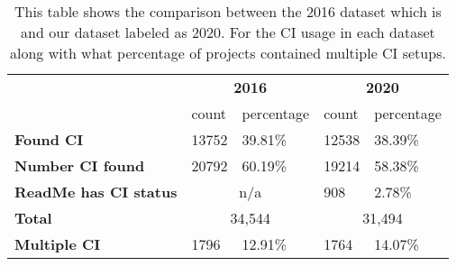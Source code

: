 \begin{table}[!ht]
    \begin{tabular}{l|l|l|l|l|}
    \cline{2-5}
                                                & \multicolumn{2}{c|}{\textbf{2016}} & \multicolumn{2}{c|}{\textbf{2020}} \\ \cline{2-5} 
                                                & count         & percentage         & count         & percentage         \\ \hline
    \multicolumn{1}{|l|}{\textbf{Found CI}}          & 13752         & 39.81\%            & 12538         & 38.39\%            \\ \hline
    \multicolumn{1}{|l|}{\textbf{Number CI found}}       & 20792         & 60.19\%            & 19214         & 58.38\%            \\ \hline
    \multicolumn{1}{|l|}{\textbf{ReadMe has CI status}}      & \multicolumn{2}{c|}{n/a}           & 908           & 2.78\%             \\ \hline
    \multicolumn{1}{|l|}{\textbf{Total}}      & \multicolumn{2}{c|}{34,544}           & \multicolumn{2}{c|}{31,494}             \\ \hline
    \multicolumn{1}{|l|}{\textbf{Multiple CI}} & 1796          & 12.91\%            & 1764          & 14.07\%            \\ \hline

    \end{tabular}
    \label{table:comparison_dataset}

    \caption{This table shows the comparison between the 2016 dataset which is\citet{Hilton2016} and our dataset labeled as 2020. For the CI usage in each dataset along with what percentage of projects contained multiple CI setups.}
\end{table}